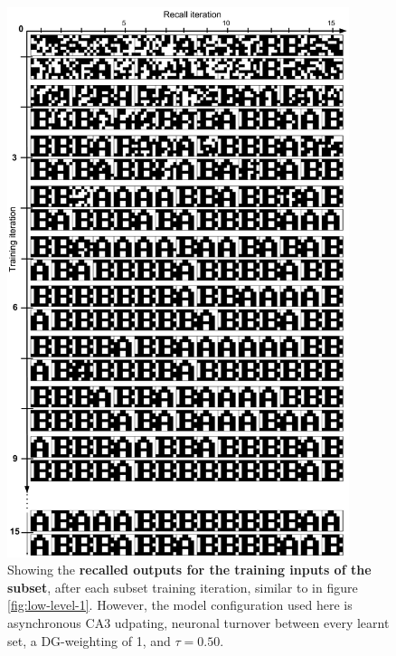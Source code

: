 \begin{figure}
    \centering
    \includegraphics[width=10cm]{fig/AB-pattern-associations-async-tm0-dgw1-tau050}
    \caption{Showing the \textbf{recalled outputs for the training inputs of the subset}, after each subset training iteration, similar to in figure \ref{fig:low-level-1}. However, the model configuration used here is asynchronous CA3 udpating, neuronal turnover between every learnt set, a DG-weighting of 1, and $\tau=0.50$.}
    \label{fig:low-level-3}
\end{figure}

